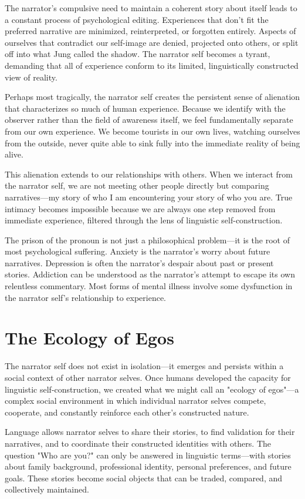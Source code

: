 The narrator's compulsive need to maintain a coherent story about itself leads to a constant process of psychological editing. Experiences that don't fit the preferred narrative are minimized, reinterpreted, or forgotten entirely. Aspects of ourselves that contradict our self-image are denied, projected onto others, or split off into what Jung called the shadow. The narrator self becomes a tyrant, demanding that all of experience conform to its limited, linguistically constructed view of reality.

Perhaps most tragically, the narrator self creates the persistent sense of alienation that characterizes so much of human experience. Because we identify with the observer rather than the field of awareness itself, we feel fundamentally separate from our own experience. We become tourists in our own lives, watching ourselves from the outside, never quite able to sink fully into the immediate reality of being alive.

This alienation extends to our relationships with others. When we interact from the narrator self, we are not meeting other people directly but comparing narratives—my story of who I am encountering your story of who you are. True intimacy becomes impossible because we are always one step removed from immediate experience, filtered through the lens of linguistic self-construction.

The prison of the pronoun is not just a philosophical problem—it is the root of most psychological suffering. Anxiety is the narrator's worry about future narratives. Depression is often the narrator's despair about past or present stories. Addiction can be understood as the narrator's attempt to escape its own relentless commentary. Most forms of mental illness involve some dysfunction in the narrator self's relationship to experience.

\section{The Ecology of Egos}

The narrator self does not exist in isolation—it emerges and persists within a social context of other narrator selves. Once humans developed the capacity for linguistic self-construction, we created what we might call an "ecology of egos"—a complex social environment in which individual narrator selves compete, cooperate, and constantly reinforce each other's constructed nature.

Language allows narrator selves to share their stories, to find validation for their narratives, and to coordinate their constructed identities with others. The question "Who are you?" can only be answered in linguistic terms—with stories about family background, professional identity, personal preferences, and future goals. These stories become social objects that can be traded, compared, and collectively maintained.

